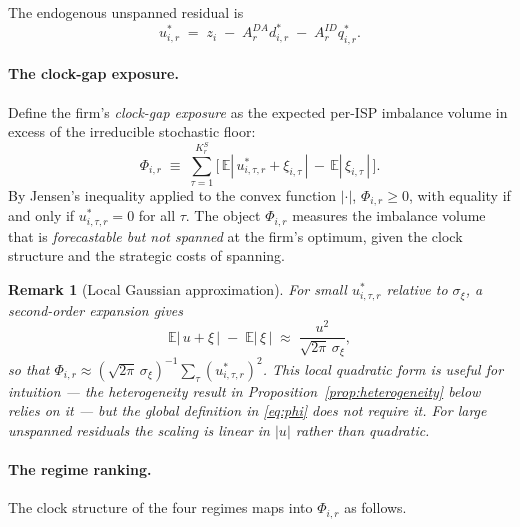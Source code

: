 \documentclass[11pt]{article}
\newtheorem{remark}{Remark}
\begin{document}
The endogenous unspanned residual is
\begin{equation}
u^{*}_{i,r} \;=\; z_{i} \;-\; A^{DA}_r d^{*}_{i,r} \;-\; A^{ID}_r q^{*}_{i,r}.
\label{eq:residual}
\end{equation}

\paragraph{The clock-gap exposure.} Define the firm's \emph{clock-gap exposure} as the expected per-ISP imbalance volume in excess of the irreducible stochastic floor:
\begin{equation}
\boxed{\;\;
\Phi_{i,r} \;\equiv\; \sum_{\tau=1}^{K^{S}_r} \big[\, \mathbb{E}\!\left|\,u^{*}_{i,\tau,r} + \xi_{i,\tau}\,\right| \,-\, \mathbb{E}\!\left|\,\xi_{i,\tau}\,\right| \,\big].
\;\;}
\label{eq:phi}
\end{equation}
By Jensen's inequality applied to the convex function $|\cdot|$, $\Phi_{i,r} \ge 0$, with equality if and only if $u^{*}_{i,\tau,r} = 0$ for all $\tau$. The object $\Phi_{i,r}$ measures the imbalance volume that is \emph{forecastable but not spanned} at the firm's optimum, given the clock structure and the strategic costs of spanning.

\begin{remark}[Local Gaussian approximation]
\label{rem:gaussian}
For small $u^{*}_{i,\tau,r}$ relative to $\sigma_{\xi}$, a second-order expansion gives
\[
\mathbb{E}|\,u + \xi\,| \;-\; \mathbb{E}|\,\xi\,| \;\approx\; \frac{u^{2}}{\sqrt{2\pi}\,\sigma_{\xi}},
\]
so that $\Phi_{i,r} \approx (\sqrt{2\pi}\,\sigma_{\xi})^{-1} \sum_{\tau} (u^{*}_{i,\tau,r})^{2}$. This local quadratic form is useful for intuition --- the heterogeneity result in Proposition~\ref{prop:heterogeneity} below relies on it --- but the global definition in \eqref{eq:phi} does not require it. For large unspanned residuals the scaling is linear in $|u|$ rather than quadratic.
\end{remark}

\paragraph{The regime ranking.} The clock structure of the four regimes maps into $\Phi_{i,r}$ as follows.
\end{document}
